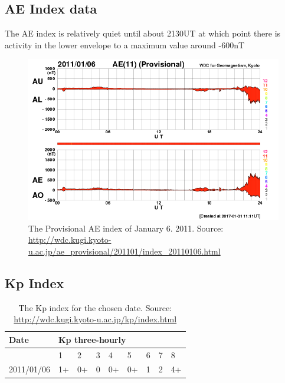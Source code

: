 \documentclass[norsk,a4paper,12pt]{article}
\begin{document}
\begin{multicols}{2}

\subsection{AE Index data} %
\label{sub:AE_index_data}

The AE index is relatively quiet until about 2130UT at which point there is activity in the lower envelope to a maximum value around -600nT
\begin{figure}[H]
	\includegraphics[scale=0.4]{Figures/pvae_2011_01_06.png}
	\centering
	\caption{The Provisional AE index of January 6. 2011. Source: \url{http://wdc.kugi.kyoto-u.ac.jp/ae_provisional/201101/index_20110106.html}}
	\label{fig:AE}
\end{figure}


\subsection{Kp Index} %
\label{sub:kp_index}

\begin{table}[H]
	\begin{tabular}{|l|l|l|l|l|l|l|l|l|}
	\hline
	Date       & \multicolumn{8}{l|}{Kp three-hourly} \\ \hline
	           & 1   & 2   & 3 & 4  & 5  & 6 & 7 & 8  \\ \hline
	2011/01/06 & 1+  & 0+  & 0 & 0+ & 0+ & 1 & 2 & 4+ \\ \hline
	\end{tabular}
	\centering
	\caption{The Kp index for the chosen date. Source: \url{http://wdc.kugi.kyoto-u.ac.jp/kp/index.html}}
	\label{table:kp_index}
\end{table}
 

\end{multicols}
\end{document}
